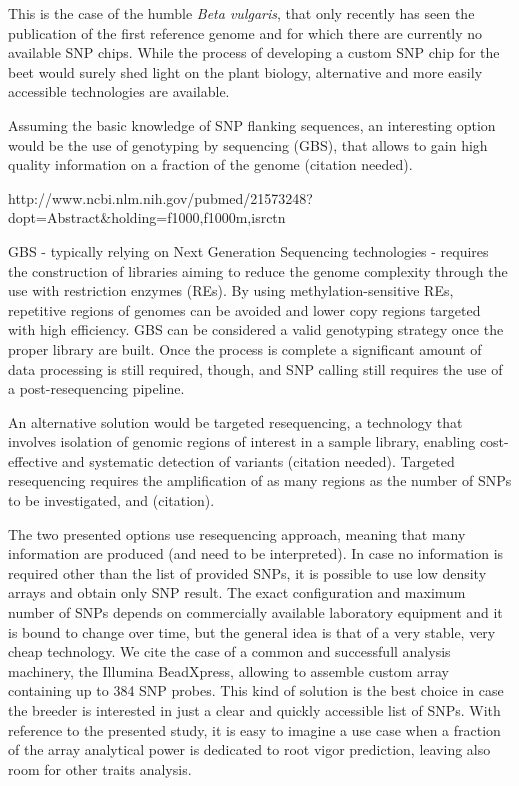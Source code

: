 This is the case of the humble \emph{Beta vulgaris}, that only recently
has seen the publication of the first reference genome \cite{dohm2013genome}
and for which there are currently no available SNP chips. While the process
of developing a custom SNP chip for the beet would surely shed light
on the plant biology, alternative and more easily accessible technologies 
are available.

Assuming the basic knowledge of SNP flanking sequences, an interesting
option would be the use of genotyping by sequencing (GBS), that allows
to gain high quality information on a fraction of the genome (citation needed). 

http://www.ncbi.nlm.nih.gov/pubmed/21573248?dopt=Abstract\&holding=f1000,f1000m,isrctn

GBS - typically relying on Next Generation Sequencing technologies - 
requires the construction of libraries aiming to reduce the genome 
complexity through the use with restriction enzymes (REs). By using 
methylation-sensitive REs, repetitive regions of genomes can be avoided 
and lower copy regions targeted with high efficiency.
GBS can be considered a valid genotyping strategy once the proper library
are built. Once the process is complete a significant amount of data 
processing is still required, though, and SNP calling still requires the use
of a post-resequencing pipeline.

An alternative solution would be targeted resequencing, a technology
that involves isolation of genomic regions of interest in a sample library, 
enabling cost-effective and systematic detection of variants (citation needed). 
Targeted resequencing requires the amplification of as many regions as
the number of SNPs to be investigated, and (citation). 

The two presented options use resequencing approach, meaning that many 
information are produced (and need to be interpreted). In case no
information is required other than the list of provided SNPs, 
it is possible to use low density arrays and obtain only
SNP result. The exact configuration and maximum number of SNPs depends on
commercially available laboratory equipment and it is bound to change over
time, but the general idea is that of a very stable, very cheap technology.
We cite the case of a common and successfull analysis machinery,
the Illumina BeadXpress, allowing to assemble custom array containing up 
to 384 SNP probes. This kind of solution is the best choice in case
the breeder is interested in just a clear and quickly accessible list of SNPs.
With reference to the presented study, it is easy to imagine a use case when a fraction
of the array analytical power is dedicated to root vigor prediction, leaving
also room for other traits analysis.

